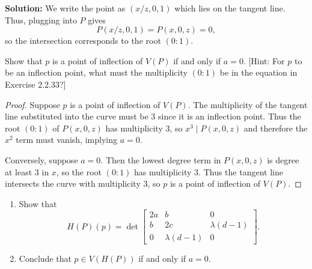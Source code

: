\textbf{Solution: }
We write the point as $(x/z, 0, 1)$ which lies on the tangent line.  
Thus, plugging into $P$ gives
\[
P(x/z, 0, 1) = P(x, 0, z) = 0,
\]
so the intersection corresponds to the root $(0 : 1)$.

\begin{tcolorbox}[title=Problem 34, breakable]
    Show that $p$ is a point of inflection of $V(P)$ if and only if $a = 0$.
    [Hint: For $p$ to be an inflection point, what must the multiplicity $(0 : 1)$
    be in the equation in Exercise 2.2.33?]
\end{tcolorbox}

\begin{proof}
    Suppose $p$ is a point of inflection of $V(P)$.
    The multiplicity of the tangent line substituted into the curve must be $3$ since 
    it is an inflection point. Thus the root $(0 : 1)$ of $P(x,0,z)$ has multiplicity $3$,
    so $x^3 \mid P(x,0,z)$ and therefore the $x^2$ term must vanish, implying $a = 0$.

    Conversely, suppose $a = 0$.
    Then the lowest degree term in $P(x,0,z)$ is degree at least $3$ in $x$,
    so the root $(0 : 1)$ has multiplicity $3$.
    Thus the tangent line intersects the curve with multiplicity $3$,
    so $p$ is a point of inflection of $V(P)$.
\end{proof}


\begin{tcolorbox}[title=Problem 35, breakable]
    \begin{enumerate}
        \item Show that 
        \[H(P)(p) = \det 
        \begin{bmatrix}
            2a & b & 0 \\
            b & 2c & \lambda (d - 1) \\
            0 & \lambda (d - 1) & 0
        \end{bmatrix}.
        \]
        \item Conclude that $p \in V(H(P))$ if and only if $a = 0$.
    \end{enumerate}
\end{tcolorbox}

